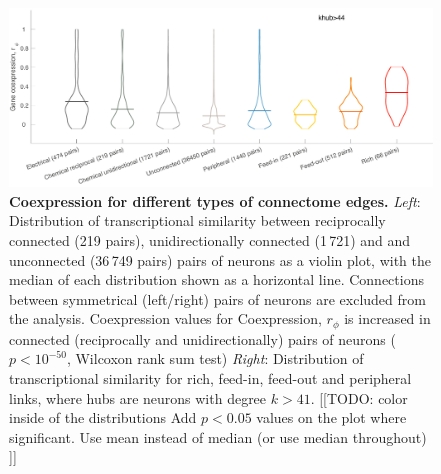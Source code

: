 \documentclass[10pt,letterpaper]{article}
\begin{document}
\begin{figure}[h]
\centering
    \includegraphics[width=1\textwidth]{distributionsALL.pdf}
    \caption{
\textbf{Coexpression for different types of connectome edges.}
\emph{Left}: Distribution of transcriptional similarity between reciprocally connected (219 pairs), unidirectionally connected (1\,721) and  and unconnected (36\,749 pairs) pairs of neurons as a violin plot, with the median of each distribution shown as a horizontal line.
Connections between symmetrical (left/right) pairs of neurons are excluded from the analysis. Coexpression values for
Coexpression, $r_\phi$ is increased in connected (reciprocally and unidirectionally) pairs of neurons ($p < 10^{-50}$, Wilcoxon rank sum test)
\emph{Right}: Distribution of transcriptional similarity for rich, feed-in, feed-out and peripheral links, where hubs are neurons with degree $k>41$.
[[TODO: color inside of the distributions
Add $p<0.05$ values on the plot where significant.
Use mean instead of median (or use median throughout)
]]
\label{fig:S_RFPdistributions}
}
\end{figure}
\end{document}
